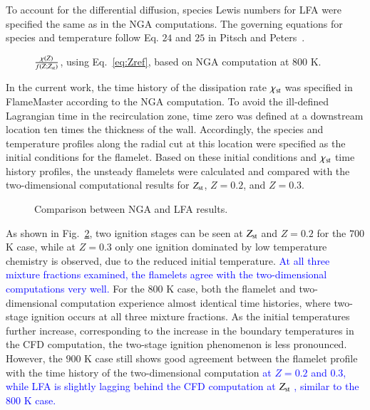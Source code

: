 \documentclass[review,3p,times]{elsarticle}
\begin{document}
To account for the differential diffusion, species Lewis numbers for LFA  were specified the same as in the NGA computations.  The governing equations for species and temperature follow Eq. $24$ and $25$ in Pitsch and Peters~\cite{pitsch98b}.

\begin{figure}
  \centering
  \scriptsize
  
  \normalsize
  \caption{$\frac{\chi(Z)}{f(Z;Z_{\rm st})}$, using Eq.~\ref{eq:Zref}, based on NGA computation at $800$ K.}
  \label{fig:Zref}
\end{figure}

In the current work, the time history of the dissipation rate $\chi_{\rm st}$ was specified in FlameMaster according to the NGA computation.  To avoid the ill-defined Lagrangian time in the recirculation zone, time zero was defined at a downstream location ten times the thickness of the wall.  Accordingly, the species and temperature profiles along the radial cut at this location were specified as the initial conditions for the flamelet.  Based on these initial conditions and $\chi_{\rm st}$ time history profiles, the unsteady flamelets were calculated and compared with the two-dimensional computational results for $Z_{\rm st}$, $Z = 0.2$, and $Z = 0.3$.       

\begin{figure}
  \centering
  \scriptsize
  
  \normalsize
  \caption{Comparison between NGA and LFA results.}
  \label{fig:LFA}
\end{figure}

As shown in Fig.~\ref{fig:LFA}, two ignition stages can be seen at $Z_{\rm st}$ and $Z = 0.2$ for the $700$ K case, while at $Z = 0.3$ only one ignition dominated by low temperature chemistry is observed, due to the reduced initial temperature.   \textcolor{blue}{At all three mixture fractions examined, the flamelets agree with the two-dimensional computations very well.}  For the $800$ K case, both the flamelet and two-dimensional computation experience almost identical time histories, where two-stage ignition occurs at all three mixture fractions.  As the initial temperatures further increase, corresponding to the increase in the boundary temperatures in the CFD computation, the two-stage ignition phenomenon is less pronounced.  However, the $900$ K case still shows good agreement between the flamelet profile with the time history of the two-dimensional computation \textcolor{blue}{at $Z = 0.2$ and $0.3$, while LFA is slightly lagging behind the CFD computation at $Z_{\rm st}$ , similar to the $800$ K case.}
  
\end{document}
